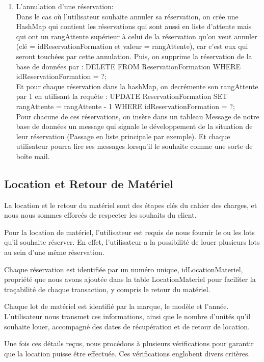 \begin{enumerate}
    \item L’annulation d’une réservation:\\
Dans le cas où l'utilisateur souhaite annuler sa réservation, on crée une HashMap qui contient les réservations qui sont aussi en liste d'attente mais qui ont un rangAttente supérieur à celui de la réservation qu'on veut annuler (clé = idReservationFormation et valeur = rangAttente), car c'est eux qui seront touchées par cette annulation. Puis, on supprime la réservation de la base de données par : DELETE FROM ReservationFormation WHERE idReservationFormation = ?;\\
Et pour chaque réservation dans la hashMap, on decrémente son rangAttente par 1 en utilisant la requête :
UPDATE ReservationFormation SET rangAttente = rangAttente - 1 WHERE idReservationFormation = ?;\\
Pour chacune de ces réservations, on insère dans un tableau Message de notre base de données un message qui signale le développement de la situation de leur réservation (Passage en liste principale par exemple). Et chaque utilisateur pourra lire ses messages lorsqu'il le souhaite comme une sorte de boîte mail.
\end{enumerate}

\subsection{Location et Retour de Matériel}
La location et le retour du matériel sont des étapes clés du cahier des charges, et nous nous sommes efforcés de respecter les souhaits du client.

Pour la location de matériel, l'utilisateur est requis de nous fournir le ou les lots qu'il souhaite réserver. En effet, l'utilisateur a la possibilité de louer plusieurs lots au sein d'une même réservation.

 Chaque réservation est identifiée par un numéro unique, idLocationMateriel, propriété que nous avons ajoutée dans la table LocationMateriel pour faciliter la traçabilité de chaque transaction, y compris le retour du matériel.


Chaque lot de matériel est identifié par la marque, le modèle et l'année.  L'utilisateur nous transmet ces informations, ainsi que le nombre d'unités qu'il souhaite louer, accompagné des dates de récupération et de retour de location.  

Une fois ces détails reçus, nous procédons à plusieurs vérifications pour garantir que la location puisse être effectuée. Ces vérifications englobent divers critères.

